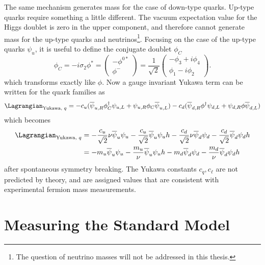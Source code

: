 The same mechanism generates mass for the case of down-type quarks. Up-type quarks require something a little different. The vacuum expectation value for the Higgs doublet is zero in the upper component, and therefore cannot generate mass for the up-type quarks and neutrinos\footnote{The question of neutrino masses will not be addressed in this thesis.}. Focusing on the case of the up-type quarks $\psi_u$, it is useful to define the conjugate doublet $\phi_C$
\begin{equation}
    \phi_C = -i\sigma_2\phi^* = 
    \begin{pmatrix}
         -\phi^{0*} \\
         \phi^-
    \end{pmatrix}
    = \dfrac{1}{\sqrt{2}}
    \begin{pmatrix}
         -\phi_3+i\phi_4\\
         \phi_1-i\phi_2
    \end{pmatrix}.
\end{equation}
which transforms exactly like $\phi$. Now a gauge invariant Yukawa term can be written for the quark families as
\begin{equation}
    \Lagrangian_{\text{Yukawa, }q}=-c_u (\overline{\psi}_{u,R}\phi_C^{\dagger}\psi_{u,L}+\psi_{u,R}\phi_C\overline{\psi}_{u,L}) - c_d (\overline{\psi}_{d,R}\phi^{\dagger}\psi_{d,L}+\psi_{d,R}\phi\overline{\psi}_{d,L})
\end{equation}
which becomes
\begin{align}
    \Lagrangian_{\text{Yukawa, }q} & = - \dfrac{c_u}{\sqrt{2}}\nu\overline{\psi}_u\psi_u - \dfrac{c_u}{\sqrt{2}}\overline{\psi}_u\psi_uh - \dfrac{c_d}{\sqrt{2}}\nu\overline{\psi}_d\psi_d - \dfrac{c_d}{\sqrt{2}}\overline{\psi}_d\psi_dh \\
                & = -m_u\overline{\psi}_u\psi_u - \dfrac{m_u}{\nu}\overline{\psi}_u\psi_u h - m_d\overline{\psi}_d\psi_d - \dfrac{m_d}{\nu}\overline{\psi}_d\psi_d h
\end{align}
after spontaneous symmetry breaking.
The Yukawa constants $c_q, c_{\ell}$ are not predicted by theory, and are assigned values that are consistent with experimental fermion mass measurements. 

\section{Measuring the Standard Model}

